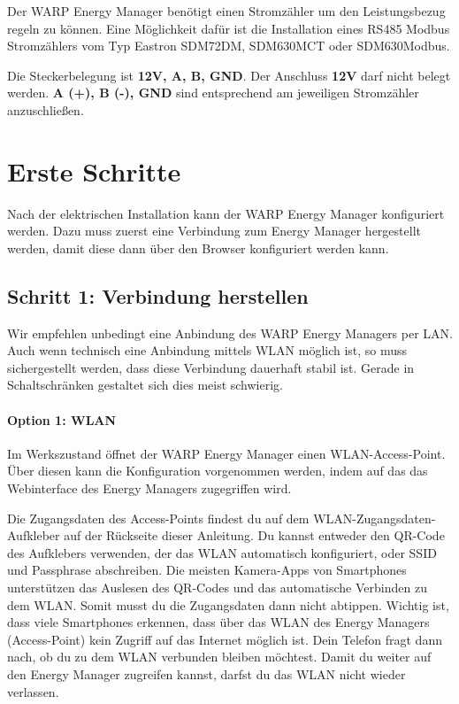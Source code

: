 \documentclass[a4paper,10pt]{article}
\newcommand{\hint}[1]{\begin{tcolorbox}[colback=boxgray,colframe=black,coltext=
white,title=Hinweis,left*=2mm,right*=2mm,boxsep=1mm,bottom=1mm,top=1mm]#1\end{tcolorbox}}
\begin{document}
\begin{multicols*}{2}
	Der WARP Energy Manager benötigt einen Stromzähler um den Leistungsbezug regeln zu 
	können. Eine Möglichkeit dafür ist die Installation eines RS485 Modbus
	Stromzählers vom Typ Eastron SDM72DM, SDM630MCT oder SDM630Modbus.
	
	Die Steckerbelegung ist \textbf{12V, A, B, GND}. Der Anschluss \textbf{12V}
	darf nicht belegt werden. \textbf{A (+), B (-), GND} sind entsprechend 
	am jeweiligen Stromzähler anzuschließen.

	\section{Erste Schritte}

	Nach der elektrischen Installation kann der WARP Energy Manager konfiguriert
	werden. Dazu muss zuerst eine Verbindung zum Energy Manager hergestellt werden, 
	damit diese dann über den Browser konfiguriert werden kann.

	\subsection{Schritt 1: Verbindung herstellen}


	\hint{Wir empfehlen unbedingt eine Anbindung des WARP Energy Managers per
	LAN. Auch wenn technisch eine Anbindung mittels WLAN möglich ist, so muss
	sichergestellt werden, dass diese Verbindung dauerhaft stabil ist. Gerade in
	Schaltschränken gestaltet sich dies meist schwierig.}

	\paragraph{Option 1: WLAN}

	Im Werkszustand öffnet der WARP Energy Manager einen WLAN-Access-Point. Über diesen kann
	die Konfiguration vorgenommen werden, indem auf das das Webinterface des
	Energy Managers zugegriffen wird.

	Die Zugangsdaten des Access-Points findest du auf dem WLAN-Zugangsdaten-Aufkleber
	auf der Rückseite dieser Anleitung. Du kannst entweder den QR-Code des Aufklebers verwenden,
	der das WLAN automatisch konfiguriert, oder SSID und Passphrase abschreiben.
	Die meisten Kamera-Apps von Smartphones unterstützen das Auslesen des
	QR-Codes und das automatische Verbinden zu dem WLAN. Somit musst du die
	Zugangsdaten dann nicht abtippen. Wichtig ist, dass viele Smartphones
	erkennen, dass über das WLAN des Energy Managers (Access-Point) kein Zugriff auf das
	Internet möglich ist. Dein Telefon fragt dann nach, ob du zu dem WLAN
	verbunden bleiben möchtest. Damit du weiter auf den Energy Manager zugreifen
	kannst, darfst du das WLAN nicht wieder verlassen.


\end{multicols*}
\end{document}
